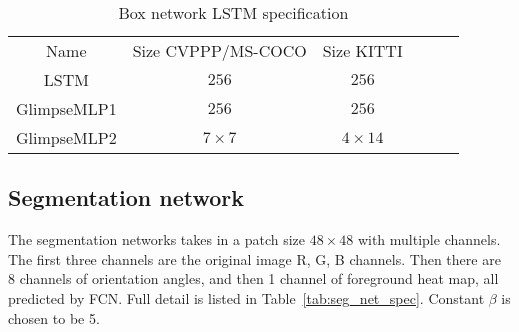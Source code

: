 \begin{table}[h!]
\caption{Box network LSTM specification}
\label{tab:box_lstm_spec}
\centering
\begin{small}
\begin{tabular}{cccccc}
Name        & Size CVPPP/MS-COCO     & Size KITTI  \\
LSTM        & $256$                  & $256$       \\
GlimpseMLP1 & $256$                  & $256$       \\
GlimpseMLP2 & $7\times7$             & $4\times14$ \\
\end{tabular}
\end{small}
\end{table}

\subsection{Segmentation network}

The segmentation networks takes in a patch size $48\times48$ with multiple
channels. The first three channels are the original image R, G, B channels.
Then there are 8 channels of orientation angles, and then 1 channel of
foreground heat map, all predicted by FCN. Full detail is listed in
Table~\ref{tab:seg_net_spec}. Constant $\beta$ is chosen to be 5.

